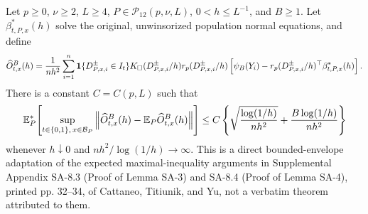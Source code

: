Let \(p\geq0\), \(\nu\geq2\), \(L\geq4\), \(P\in\mathcal P_{12}(p,\nu,L)\), \(0<h\leq L^{-1}\), and \(B\geq1\).  Let \(\beta^*_{t,P,x}(h)\) solve the original, unwinsorized population normal equations, and define
\[
 \widehat O^B_{t,x}(h)={1\over nh^2}\sum_{i=1}^n
 \mathbf1\{D^{\pm}_{P,x,i}\in I_t\}K_\square(D^{\pm}_{P,x,i}/h)
 r_p(D^{\pm}_{P,x,i}/h)
 \left[\psi_B(Y_i)-r_p(D^{\pm}_{P,x,i}/h)^\top\beta^*_{t,P,x}(h)\right].
\]
There is a constant \(C=C(p,L)\) such that
\[
 \mathbb E_P^*\!\left[
 \sup_{t\in\{0,1\},\,x\in\mathcal B_P}
 \left\|\widehat O^B_{t,x}(h)-\mathbb E_P\widehat O^B_{t,x}(h)\right\|
 \right]
 \leq C\left\{
 \sqrt{{\log(1/h)\over nh^2}}+{B\log(1/h)\over nh^2}
 \right\}
\]
whenever \(h\downarrow0\) and \(nh^2/\log(1/h)\to\infty\).  This is a direct bounded-envelope adaptation of the expected maximal-inequality arguments in Supplemental Appendix SA-8.3 (Proof of Lemma SA-3) and SA-8.4 (Proof of Lemma SA-4), printed pp. 32--34, of Cattaneo, Titiunik, and Yu, not a verbatim theorem attributed to them.